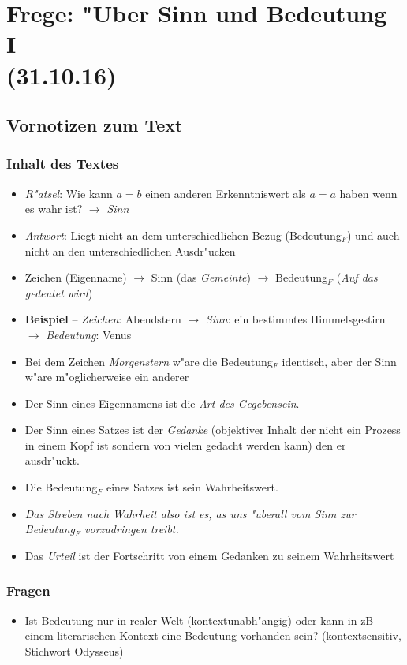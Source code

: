 \documentclass[emulatestandardclasses]{scrartcl}
\begin{document}
\newpage



\section{Frege: "Uber Sinn und Bedeutung I\\(31.10.16)}

\subsection{Vornotizen zum Text}
\subsubsection{Inhalt des Textes}
\begin{itemize}
  \item \emph{R"atsel}: Wie kann $a = b$ einen anderen Erkenntniswert als $ a = a$ haben wenn es wahr ist? $\rightarrow$ \emph{Sinn} 
  \item \emph{Antwort}: Liegt nicht an dem unterschiedlichen Bezug (Bedeutung$_{F}$) und auch nicht an den unterschiedlichen Ausdr"ucken
  \item Zeichen (Eigenname) $\rightarrow$ Sinn (das \emph{Gemeinte}) $\rightarrow$ Bedeutung$_{F}$ (\emph{Auf das gedeutet wird})
  \item \textbf{Beispiel} -- \emph{Zeichen}: Abendstern $\rightarrow$ \emph{Sinn}: ein bestimmtes Himmelsgestirn $\rightarrow$ \emph{Bedeutung}: Venus 
  \item Bei dem Zeichen \emph{Morgenstern} w"are die Bedeutung$_{F}$ identisch, aber der Sinn w"are m"oglicherweise ein anderer
  \item Der Sinn eines Eigennamens ist die \emph{Art des Gegebensein}.
  \item Der Sinn eines Satzes ist der \emph{Gedanke} (objektiver Inhalt der nicht ein Prozess in einem Kopf ist sondern von vielen gedacht werden kann) den er ausdr"uckt.
  \item Die Bedeutung$_{F}$ eines Satzes ist sein Wahrheitswert.
  \item \emph{Das Streben nach Wahrheit also ist es, as uns "uberall vom Sinn zur Bedeutung$_{F}$ vorzudringen treibt.}
  \item Das \emph{Urteil} ist der Fortschritt von einem Gedanken zu seinem Wahrheitswert
\end{itemize}
\subsubsection{Fragen}
\begin{itemize}
  \item Ist Bedeutung nur in realer Welt (kontextunabh"angig) oder kann in zB einem literarischen Kontext eine Bedeutung vorhanden sein? (kontextsensitiv, Stichwort Odysseus)
\end{itemize}
\end{document}
